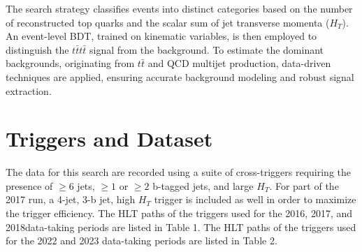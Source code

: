 \documentclass[twoside]{article}
\begin{document}
The search strategy classifies events into distinct categories based on the number of reconstructed top quarks and the scalar sum of jet transverse momenta (\(H_T\)). An event-level BDT, trained on kinematic variables, is then employed to distinguish the \(t\bar{t}t\bar{t}\) signal from the background. To estimate the dominant backgrounds, originating from \(t\bar{t}\) and QCD multijet production, data-driven techniques are applied, ensuring accurate background modeling and robust signal extraction.


\section{Triggers and Dataset}
\label{sec:trigger}

The data for this search are recorded using a suite of cross-triggers requiring the presence of $\ge 6$ jets, $\ge 1$ or $\ge 2$ b-tagged jets, and large $H_T$. For part of the 2017 run, a 4-jet, 3-b jet, high $H_T$ trigger is included as well in order to maximize the trigger efficiency. The HLT paths of the triggers used for the 2016, 2017, and 2018data-taking periods are listed in Table 1. The HLT paths of the triggers used for the 2022 and 2023 data-taking periods are listed in Table 2. 
\end{document}
